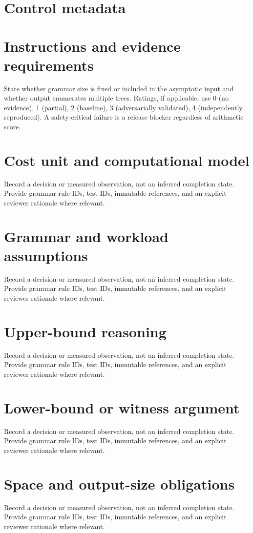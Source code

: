 \documentclass[11pt,letterpaper]{article}
\begin{document}
\makedoctitle\makedocsummary
\tableofcontents\clearpage
\section{Control metadata}
\section{Instructions and evidence requirements}
State whether grammar size is fixed or included in the asymptotic input and whether output enumerates multiple trees. Ratings, if applicable, use 0 (no evidence), 1 (partial), 2 (baseline), 3 (adversarially validated), 4 (independently reproduced). A safety-critical failure is a release blocker regardless of arithmetic score.
\section{Cost unit and computational model}
Record a decision or measured observation, not an inferred completion state. Provide grammar rule IDs, test IDs, immutable references, and an explicit reviewer rationale where relevant.
\section{Grammar and workload assumptions}
Record a decision or measured observation, not an inferred completion state. Provide grammar rule IDs, test IDs, immutable references, and an explicit reviewer rationale where relevant.
\section{Upper-bound reasoning}
Record a decision or measured observation, not an inferred completion state. Provide grammar rule IDs, test IDs, immutable references, and an explicit reviewer rationale where relevant.
\section{Lower-bound or witness argument}
Record a decision or measured observation, not an inferred completion state. Provide grammar rule IDs, test IDs, immutable references, and an explicit reviewer rationale where relevant.
\section{Space and output-size obligations}
Record a decision or measured observation, not an inferred completion state. Provide grammar rule IDs, test IDs, immutable references, and an explicit reviewer rationale where relevant.
\end{document}
